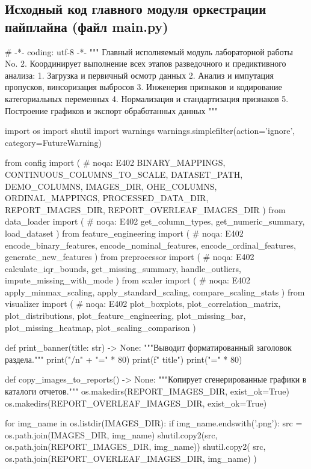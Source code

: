 \documentclass[14pt,a4paper]{extarticle}
\begin{document}
\subsection{Исходный код главного модуля оркестрации пайплайна (файл main.py)}
\begin{CodeListing}
# -*- coding: utf-8 -*-
"""
Главный исполняемый модуль лабораторной работы No.  2.
Координирует выполнение всех этапов разведочного и предиктивного анализа:
1. Загрузка и первичный осмотр данных
2. Анализ и импутация пропусков, винсоризация выбросов
3. Инженерия признаков и кодирование категориальных переменных
4. Нормализация и стандартизация признаков
5. Построение графиков и экспорт обработанных данных
"""

import os
import shutil
import warnings
warnings.simplefilter(action='ignore', category=FutureWarning)

from config import (  # noqa: E402
    BINARY_MAPPINGS,
    CONTINUOUS_COLUMNS_TO_SCALE,
    DATASET_PATH,
    DEMO_COLUMNS,
    IMAGES_DIR,
    OHE_COLUMNS,
    ORDINAL_MAPPINGS,
    PROCESSED_DATA_DIR,
    REPORT_IMAGES_DIR,
    REPORT_OVERLEAF_IMAGES_DIR
)
from data_loader import (  # noqa: E402
    get_column_types,
    get_numeric_summary,
    load_dataset
)
from feature_engineering import (  # noqa: E402
    encode_binary_features,
    encode_nominal_features,
    encode_ordinal_features,
    generate_new_features
)
from preprocessor import (  # noqa: E402
    calculate_iqr_bounds,
    get_missing_summary,
    handle_outliers,
    impute_missing_with_mode
)
from scaler import (  # noqa: E402
    apply_minmax_scaling,
    apply_standard_scaling,
    compare_scaling_stats
)
from visualizer import (  # noqa: E402
    plot_boxplots,
    plot_correlation_matrix,
    plot_distributions,
    plot_feature_engineering,
    plot_missing_bar,
    plot_missing_heatmap,
    plot_scaling_comparison
)


def print_banner(title: str) -> None:
    """Выводит форматированный заголовок раздела."""
    print("/n" + "=" * 80)
    print(f"  {title}")
    print("=" * 80)


def copy_images_to_reports() -> None:
    """Копирует сгенерированные графики в каталоги отчетов."""
    os.makedirs(REPORT_IMAGES_DIR, exist_ok=True)
    os.makedirs(REPORT_OVERLEAF_IMAGES_DIR, exist_ok=True)

    for img_name in os.listdir(IMAGES_DIR):
        if img_name.endswith('.png'):
            src = os.path.join(IMAGES_DIR, img_name)
            shutil.copy2(src, os.path.join(REPORT_IMAGES_DIR, img_name))
            shutil.copy2(
                src, os.path.join(REPORT_OVERLEAF_IMAGES_DIR, img_name)
            )



\end{CodeListing}
\end{document}
